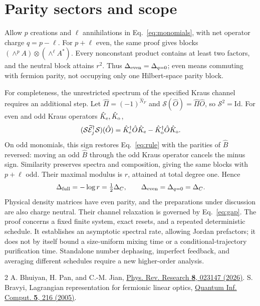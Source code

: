 \documentclass[aps,prb,twocolumn,10pt,nofootinbib,superscriptaddress]{revtex4-2}
\newcommand{\E}{\widetilde{\mathcal E}}
\begin{document}
\section{Parity sectors and scope}
Allow $p$ creations and $\ell$ annihilations in Eq.~\eqref{eq:monomials},
with net operator charge $q=p-\ell$.
For $p+\ell$ even, the same proof gives blocks
$(\wedge^p A)\otimes(\wedge^\ell A^*)$. Every nonconstant product contains
at least two factors, and the neutral block attains $r^2$. Thus
$\Delta_{\rm even}=\Delta_{q=0}$; even means commuting with fermion
parity, not occupying only one Hilbert-space parity block.

For completeness, the unrestricted spectrum of the specified Kraus
channel requires an additional step. Let $\hat\Pi=(-1)^{\hat N_F}$ and
$\mathcal S(\hat O)=\hat\Pi\hat O$, so $\mathcal S^2=\mathrm{Id}$.
For even and odd Kraus operators $\hat K_{\rm e},\hat K_{\rm o}$,
\begin{equation}
 (\mathcal S\E_j^\dagger\mathcal S)(\hat O)
 =\hat K_{\rm e}^\dagger\hat O\hat K_{\rm e}
 -\hat K_{\rm o}^\dagger\hat O\hat K_{\rm o}. \label{eq:twist}
\end{equation}
On odd monomials, this sign restores Eq.~\eqref{eq:rule} with the
parities of $\hat B$ reversed: moving an odd $\hat B$ through the odd
Kraus operator cancels the minus sign. Similarity preserves spectra and
composition, giving the same blocks with $p+\ell$ odd. Their maximal
modulus is $r$, attained at total degree one. Hence
\begin{equation}
 \Delta_{\rm full}=-\log r=\tfrac12\Delta_C,
 \qquad \Delta_{\rm even}=\Delta_{q=0}=\Delta_C. \label{eq:sectors}
\end{equation}
Physical density matrices have even parity, and the preparations under
discussion are also charge neutral. Their channel relaxation is governed
by Eq.~\eqref{eq:gap}. The proof concerns a fixed finite system, exact
resets, and a repeated deterministic schedule. It establishes an
asymptotic spectral rate, allowing Jordan prefactors; it does not by itself
bound a size-uniform mixing time or a conditional-trajectory purification
time. Standalone number dephasing, imperfect feedback, and averaging
different schedules require a new higher-order analysis.

\begin{thebibliography}{2}
A. Bhuiyan, H. Pan, and C.-M. Jian,
\href{https://doi.org/10.1103/nk38-ygyq}{Phys. Rev. Research \textbf{8}, 023147 (2026)}.
S. Bravyi, Lagrangian representation for fermionic linear optics,
\href{https://arxiv.org/abs/quant-ph/0404180}{Quantum Inf. Comput. \textbf{5}, 216 (2005)}.
\end{thebibliography}
\end{document}
